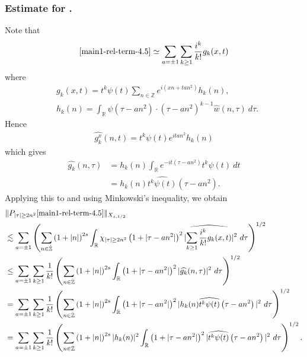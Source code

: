 \documentclass[12pt,reqno]{amsart}
\numberwithin{equation}{section}  %
\renewcommand{\cref}{\Cref}
\newcommand{\rr}{\mathbb{R}}
\newcommand{\zz}{\mathbb{Z}}
\newcommand{\zzdot}{\dot{\zz}}
\newcommand{\wh}{\widehat}
\begin{document}
\subsubsection{Estimate for \cref{main1-rel-term-4.5}.}
Note that
%
%
\begin{equation}
	\label{1n}
	\begin{split}
    \cref{main1-rel-term-4.5} \simeq \sum_{a = \pm 1}\sum_{k \ge 1}
		\frac{i^k}{k!}g_k(x,t)
	\end{split}
\end{equation}
%
%
where 
%
%
\begin{equation*}
	\begin{split}
	  & g_k(x,t) = t^k \psi(t) \sum_{n \in \zz}  e^{i\left( xn + ta n^{2}
		\right)} h_k(n),
		\\
		& h_k(n) = \int_\rr \psi \left( \tau - an^{2} \right) \cdot \left(
		\tau - an^{2} \right)^{k -1} \wh{w}(n, \tau) \ d \tau.
	\end{split}
\end{equation*}
%
%
Hence
%
%
\begin{equation*}
	\begin{split}
		\wh{g_k^x}(n, t) = t^{k} \psi(t) e^{i t an^{2}} h_k(n)
	\end{split}
\end{equation*}
%
%
which gives
%
%
\begin{equation*}
	\begin{split}
		\wh{g_k}(n, \tau)
		& = h_k(n) \int_\rr e^{-it\left( \tau - an^{2} \right)}
		t^{k}\psi(t) \ dt
		\\
		& = h_k(n) \wh{t^{k}\psi(t)} \left( \tau - an^{2} \right).
	\end{split}
\end{equation*}
%
%
Applying this to \cref{1n} and using Minkowski's inequality, we obtain
%
%
\begin{equation}
	\label{2n}
	\begin{split}
		& \|P_{| \tau | \ge 2n^{2}}\cref{main1-rel-term-4.5}\|_{X_{s,1/2}} 
    \\
    & \lesssim \sum_{a = \pm 1} \left( \sum_{n \in \zzdot} \left (1 + |n| \right )^{2s}
    \int_\rr \chi_{| \tau | \ge 2n^{2}} \left( 1 + | \tau - an^{2} | \right)^{2}
    | \wh{\sum_{k \ge 1} \frac{i^k}{k!}g_k(x,t)} |^2 \ d \tau
		\right)^{1/2}
		\\
		& \le \sum_{a = \pm 1}\sum_{k \ge 1} \frac{1}{k!}\left( \sum_{n \in \zzdot} \left (1 + |n| \right )^{2s}
    \int_\rr \left( 1 + | \tau - an^{2} | \right)^{2} | \wh{g_k}(n, \tau) |^2 \
		d \tau \right)^{1/2}
		\\
		& = \sum_{a = \pm 1}\sum_{k \ge 1} \frac{1}{k!} \left( \sum_{n \in \zzdot} \left (1 + |n| \right )^{2s}
    \int_\rr \left( 1 + | \tau - an^{2} | \right)^{2} | h_k(n) \wh{t^k
		\psi(t)} \left( \tau - an^{2} \right) |^2 \ d \tau \right)^{1/2}
		\\
		& = \sum_{a = \pm 1}\sum_{k \ge 1} \frac{1}{k!} \left( \sum_{n \in \zzdot} \left (1 + |n| \right )^{2s} |
    h_k(n) |^2 \int_\rr \left( 1 + | \tau - an^{2} | \right)^{2} | \wh{t^k
		\psi(t)} \left( \tau - an^{2} \right) |^2 \ d \tau \right)^{1/2}.
	\end{split}
\end{equation}
\end{document}
